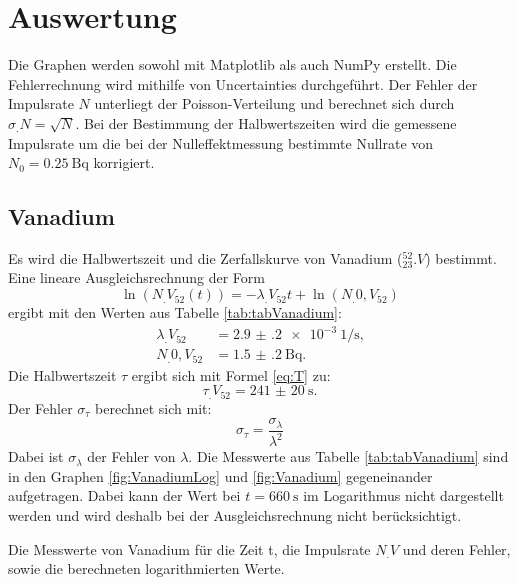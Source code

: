 \section{Auswertung}
\label{sec:Auswertung}

Die Graphen werden sowohl mit Matplotlib \cite{matplotlib} als auch NumPy \cite{numpy} erstellt. Die Fehlerrechnung wird mithilfe von Uncertainties \cite{uncertainties} durchgeführt. Der Fehler der Impulsrate $N$ unterliegt der Poisson-Verteilung und berechnet sich durch $\sigma_.N=\sqrt{N}$. Bei der Bestimmung der Halbwertszeiten wird die gemessene Impulsrate um die bei der Nulleffektmessung bestimmte Nullrate von $N_0=\SI{0.25}{\becquerel}$ korrigiert.

\subsection{Vanadium}

Es wird die Halbwertszeit und die Zerfallskurve von Vanadium ($^{52}_{23}.V$) bestimmt.
Eine lineare Ausgleichsrechnung der Form \[\ln(N_.{V_{52}}(t))=-\lambda_.{V_{52}} t+\ln(N_.{0,V_{52}})\] ergibt mit den Werten aus Tabelle \ref{tab:tabVanadium}:
\begin{align*}
\lambda_.{V_{52}}	&= \SI{2.9(2)e-3}{1\per\second}\text{,}\\
N_.{0,V_{52}} 		&= \SI{1.5(2)}{\becquerel}\text{.}
\end{align*}
Die Halbwertszeit $\tau$ ergibt sich mit Formel \eqref{eq:T} zu:
\begin{equation*}
\tau_.{V_{52}} = \SI{241(20)}{\second}\text{.}
\end{equation*}
Der Fehler $\sigma_{\tau}$ berechnet sich mit:
\begin{equation}
\sigma_{\tau} = \frac{\sigma_{\lambda}}{\lambda^2}\label{eq:sigma_tau}
\end{equation}
Dabei ist $\sigma_{\lambda}$ der Fehler von $\lambda$. Die Messwerte aus Tabelle \ref{tab:tabVanadium} sind in den Graphen \ref{fig:VanadiumLog} und \ref{fig:Vanadium} gegeneinander aufgetragen. Dabei kann der Wert bei $t=\SI{660}{\second}$ im Logarithmus nicht dargestellt werden und wird deshalb bei der Ausgleichsrechnung nicht berücksichtigt.

\begin{table}
	\centering
	\caption{Die Messwerte von Vanadium für die Zeit t, die Impulsrate $N_.V$ und deren Fehler, sowie die berechneten logarithmierten Werte.}
	
	\label{tab:tabVanadium}
\end{table}

